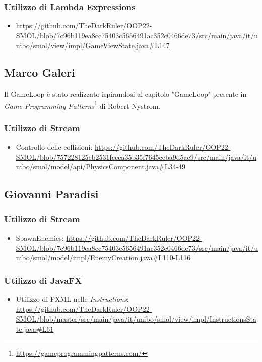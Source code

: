 \documentclass[a4paper,12pt]{report}
\begin{document}
\subsubsection{Utilizzo di Lambda Expressions}
\begin{itemize}
    \item \url{https://github.com/TheDarkRuler/OOP22-SMOL/blob/7c96b119ea8cc75403c5656491ac352c0466de73/src/main/java/it/unibo/smol/view/impl/GameViewState.java#L147}
\end{itemize}
\subsection*{Marco Galeri}

Il GameLoop è stato realizzato ispirandosi al capitolo "GameLoop" presente in \emph{Game Programming Patterns}\footnote{\url{https://gameprogrammingpatterns.com/}} di Robert Nystrom.

\subsubsection{Utilizzo di Stream}
\begin{itemize}
    \item Controllo delle collisioni: \url{https://github.com/TheDarkRuler/OOP22-SMOL/blob/757228125cb2531fccca35b35f7645ceba9d5ae9/src/main/java/it/unibo/smol/model/api/PhysicsComponent.java#L34-49}

\end{itemize}

\subsection*{Giovanni Paradisi}

\subsubsection{Utilizzo di Stream}
\begin{itemize}
    \item SpawnEnemies: \url{https://github.com/TheDarkRuler/OOP22-SMOL/blob/7c96b119ea8cc75403c5656491ac352c0466de73/src/main/java/it/unibo/smol/model/impl/EnemyCreation.java#L110-L116}
\end{itemize}

\subsubsection*{Utilizzo di JavaFX}
\begin{itemize}
    \item Utilizzo di FXML nelle \emph{Instructions}: \url{https://github.com/TheDarkRuler/OOP22-SMOL/blob/master/src/main/java/it/unibo/smol/view/impl/InstructionsState.java#L61}
\end{itemize}
\end{document}
